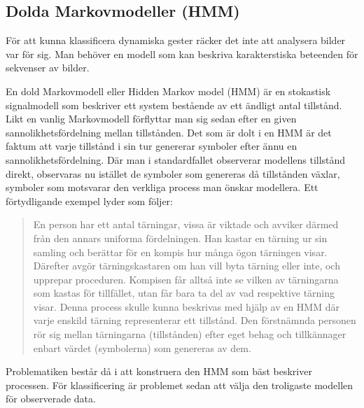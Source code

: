 \documentclass[../rapport_MVEX01-11-05]{subfiles}
\begin{document}
\subsection{Dolda Markovmodeller (HMM)}\label{sec:HMM}
För att kunna klassificera dynamiska gester räcker det inte att 
analysera bilder var för sig. Man behöver en modell som kan beskriva
karakterstiska beteenden för sekvenser av bilder.  

En dold Markovmodell eller Hidden Markov model (HMM) är en stokastisk 
signalmodell som
beskriver ett system bestående av ett ändligt antal tillstånd. Likt en
vanlig Markovmodell förflyttar man sig sedan efter en given
sannolikhetsfördelning mellan tillstånden. Det som är dolt i en HMM är
det faktum att varje tillstånd i sin tur genererar
symboler efter ännu en sannolikhetsfördelning. Där man i standardfallet
observerar modellens tillstånd direkt, observaras nu istället de
symboler som genereras då tillstånden växlar, symboler som motsvarar
den verkliga process man önskar modellera. Ett förtydligande exempel
lyder som följer: 

\begin{quote}
En person har ett antal tärningar, vissa är viktade och avviker därmed
från den annars uniforma fördelningen. Han kastar en tärning ur sin
samling och berättar för en kompis hur många ögon tärningen
visar. Därefter avgör tärningskastaren om han vill byta tärning eller
inte, och upprepar proceduren. Kompisen får alltså inte se vilken av
tärningarna som kastas för tillfället, utan får bara ta del av vad
respektive tärning visar. Denna process skulle kunna beskrivas med
hjälp av en HMM där varje enskild tärning representerar ett
tillstånd. Den förstnämnda personen rör sig mellan tärningarna
(tillstånden) efter eget behag och tillkännager enbart värdet
(symbolerna) som genereras av dem. 
\end{quote}

Problematiken består då i att konstruera den HMM som bäst beskriver
processen. För klassificering är problemet sedan att välja den troligaste
modellen
för observerade data. 

\end{document}
